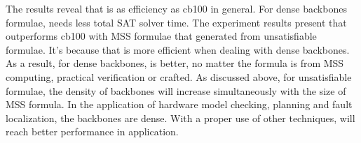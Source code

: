 

The results reveal that \tool is as efficiency as cb100 in general. For dense backbones formulae, \tool needs less total SAT solver time. The experiment results present that \tool outperforms cb100 with MSS formulae that generated from unsatisfiable formulae. It's because that \tool is more efficient when dealing with dense backbones. As a result, for dense backbones, \tool is better, no matter the formula is from MSS computing, practical verification or crafted.
As discussed above, for unsatisfiable formulae, the density of backbones will increase simultaneously with the size of MSS formula. In the application of hardware model checking, planning and fault localization, the backbones are dense. With a proper use of other techniques, \tool will reach better performance in application.





